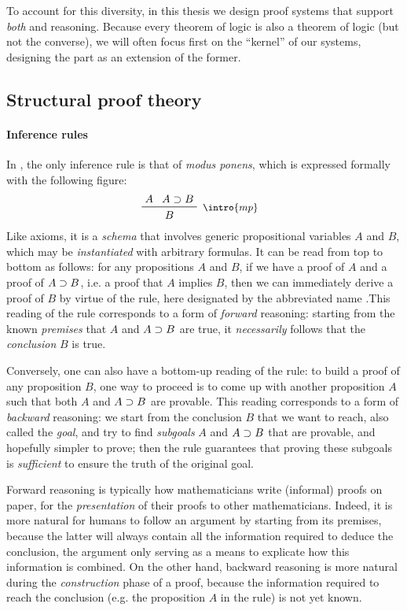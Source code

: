 \begin{emphpar}
To account for this diversity, in this thesis we design proof systems that
support \emph{both}  and  reasoning. Because every
theorem of  logic is also a theorem of  logic (but not
the converse), we will often focus first on the  ``kernel'' of our
systems, designing the  part as an extension of the former.
\end{emphpar}

\subsection{Structural proof theory}

\paragraph{Inference rules}

In , the only inference rule is that of \emph{modus ponens},
which is expressed formally with the following figure:
$$\R[\intro{mp}]{A}{A \limp B}{B}$$
Like axioms, it is a \emph{schema} that involves generic propositional variables
$A$ and $B$, which may be \emph{instantiated} with arbitrary formulas. It can be
read from top to bottom as follows: for any propositions $A$ and $B$, if we have
a proof of $A$ and a proof of $A \supset B$, i.e. a proof that $A$ implies $B$,
then we can immediately derive a proof of $B$ by virtue of the rule, here
designated by the abbreviated name .This reading of the rule
corresponds to a form of \emph{forward} reasoning: starting from the known
\emph{premises} that $A$ and $A \supset B$ are true, it \emph{necessarily} follows
that the \emph{conclusion} $B$ is true.

Conversely, one can also have a bottom-up reading of the rule: to build a proof
of any proposition $B$, one way to proceed is to come up with another
proposition $A$ such that both $A$ and $A \supset B$ are provable. This reading
corresponds to a form of \emph{backward} reasoning: we start from the conclusion
$B$ that we want to reach, also called the \emph{goal}, and try to find
\emph{subgoals} $A$ and $A \supset B$ that are provable, and hopefully simpler to
prove; then the rule guarantees that proving these subgoals is \emph{sufficient}
to ensure the truth of the original goal.

Forward reasoning is typically how mathematicians write (informal) proofs on
paper, for the \emph{presentation} of their proofs to other mathematicians.
Indeed, it is more natural for humans to follow an argument by starting from its
premises, because the latter will always contain all the information required to
deduce the conclusion, the argument only serving as a means to explicate how
this information is combined. On the other hand, backward reasoning is more
natural during the \emph{construction} phase of a proof, because the information
required to reach the conclusion (e.g. the proposition $A$ in the  rule)
is not yet known.


